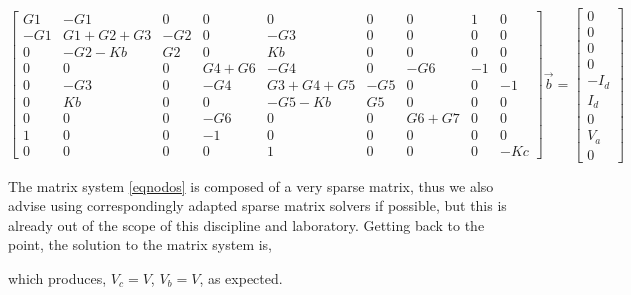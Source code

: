 \begin{equation}
    \begin{bmatrix}
     G1 &  -G1      &  0 &    0  &     0      &  0  &  0    &  1 &   0\\
     -G1 & G1+G2+G3 & -G2  & 0   &  -G3       &  0  &  0    &  0 &   0\\
     0   & -G2-Kb    & G2  & 0   &   Kb       &  0  &  0    &  0 &   0\\
     0   & 0        & 0   & G4+G6 & -G4       &  0  & -G6   & -1 &   0\\
     0   & -G3      &  0 &  -G4  &   G3+G4+G5 & -G5 &  0    & 0  &  -1\\
     0   & Kb       & 0  &  0    & -G5-Kb     & G5  & 0     & 0  &   0\\
     0   & 0        & 0  & -G6   &  0         & 0   & G6+G7 & 0  &   0\\
     1   & 0        & 0  & -1    &  0         & 0   & 0     & 0  &   0\\
     0   & 0        & 0  &  0    &  1         & 0   & 0     & 0  & -Kc
    \end{bmatrix} 
    \Vec{b}
    = 
    \begin{bmatrix}
        0\\
        0\\
        0\\
        0\\
        -I_d\\
        I_d\\
        0\\
        V_a\\
        0
    \end{bmatrix}
\label{eqnodos}
\end{equation}

The matrix system \ref{eqnodos} is composed of a very sparse matrix, thus we also advise using correspondingly adapted sparse matrix solvers if possible, but this is already out of the scope of this discipline and laboratory. Getting back to the point, the solution to the matrix system is,



which produces, $V_c = V$, $V_b = V$, as expected.